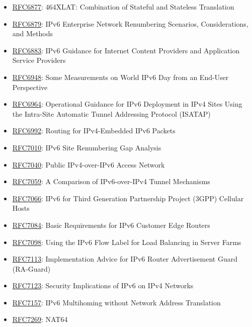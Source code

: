 \documentclass[
]{article}
\begin{document}
\begin{itemize}
\item
  \href{https://www.rfc-editor.org/info/rfc6877}{RFC6877}: 464XLAT:
  Combination of Stateful and Stateless Translation
\item
  \href{https://www.rfc-editor.org/info/rfc6879}{RFC6879}: IPv6
  Enterprise Network Renumbering Scenarios, Considerations, and Methods
\item
  \href{https://www.rfc-editor.org/info/rfc6883}{RFC6883}: IPv6 Guidance
  for Internet Content Providers and Application Service Providers
\item
  \href{https://www.rfc-editor.org/info/rfc6948}{RFC6948}: Some
  Measurements on World IPv6 Day from an End-User Perspective
\item
  \href{https://www.rfc-editor.org/info/rfc6964}{RFC6964}: Operational
  Guidance for IPv6 Deployment in IPv4 Sites Using the Intra-Site
  Automatic Tunnel Addressing Protocol (ISATAP)
\item
  \href{https://www.rfc-editor.org/info/rfc6992}{RFC6992}: Routing for
  IPv4-Embedded IPv6 Packets
\item
  \href{https://www.rfc-editor.org/info/rfc7010}{RFC7010}: IPv6 Site
  Renumbering Gap Analysis
\item
  \href{https://www.rfc-editor.org/info/rfc7040}{RFC7040}: Public
  IPv4-over-IPv6 Access Network
\item
  \href{https://www.rfc-editor.org/info/rfc7059}{RFC7059}: A Comparison
  of IPv6-over-IPv4 Tunnel Mechanisms
\item
  \href{https://www.rfc-editor.org/info/rfc7066}{RFC7066}: IPv6 for
  Third Generation Partnership Project (3GPP) Cellular Hosts
\item
  \href{https://www.rfc-editor.org/info/rfc7084}{RFC7084}: Basic
  Requirements for IPv6 Customer Edge Routers
\item
  \href{https://www.rfc-editor.org/info/rfc7098}{RFC7098}: Using the
  IPv6 Flow Label for Load Balancing in Server Farms
\item
  \href{https://www.rfc-editor.org/info/rfc7113}{RFC7113}:
  Implementation Advice for IPv6 Router Advertisement Guard (RA-Guard)
\item
  \href{https://www.rfc-editor.org/info/rfc7123}{RFC7123}: Security
  Implications of IPv6 on IPv4 Networks
\item
  \href{https://www.rfc-editor.org/info/rfc7157}{RFC7157}: IPv6
  Multihoming without Network Address Translation
\item
  \href{https://www.rfc-editor.org/info/rfc7269}{RFC7269}: NAT64

\end{itemize}
\end{document}
